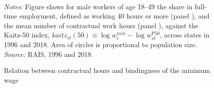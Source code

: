 \begin{figure}[!htb]
  \centering
  \caption{\label{fig: hours-kaitz}Relation between contractual hours and bindingness of the minimum wage}
  \prefigvspace
  \\
  \postfigvspace
  \begin{minipage}[t]{1\columnwidth}%
    \begin{spacing}{0.75}
      \emph{\scriptsize{}Notes:}{\scriptsize{} Figure shows for male workers
      of age 18--49 the share in full-time employment, defined as working
      40 hours or more (panel ), and the
      mean number of contractual work hours (panel ),
      against the Kaitz-50 index, $kaitz_{st}(50)\equiv\log w_{t}^{min}-\log w_{st}^{\text{P}50}$,
      across states in 1996 and 2018. Area of circles is proportional to
      population size. %
      \emph{\scriptsize{}Source: } RAIS, 1996 and 2018.}
    \end{spacing}
  \end{minipage}
\end{figure}
